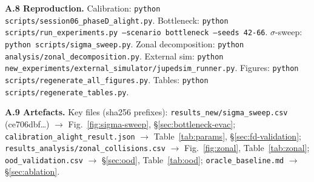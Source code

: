 \documentclass[a4paper,twoside]{article}
\begin{document}
\textbf{A.8 Reproduction.} Calibration: \texttt{python scripts/session06\_phaseD\_alight.py}. Bottleneck: \texttt{python scripts/run\_experiments.py --scenario bottleneck --seeds 42-66}. $\sigma$-sweep: \texttt{python scripts/sigma\_sweep.py}. Zonal decomposition: \texttt{python analysis/zonal\_decomposition.py}. External sim: \texttt{python new\_experiments/external\_simulator/jupedsim\_runner.py}. Figures: \texttt{python scripts/regenerate\_all\_figures.py}. Tables: \texttt{python scripts/regenerate\_tables.py}.

\textbf{A.9 Artefacts.} Key files (sha256 prefixes): \texttt{results\_new/sigma\_sweep.csv} (ce706dbf\ldots) $\to$ Fig.~\ref{fig:sigma-sweep}, \S\ref{sec:bottleneck-evac}; \texttt{calibration\_alight\_result.json} $\to$ Table~\ref{tab:params}, \S\ref{sec:fd-validation}; \texttt{results\_analysis/zonal\_collisions.csv} $\to$ Fig.~\ref{fig:zonal}, Table~\ref{tab:zonal}; \texttt{ood\_validation.csv} $\to$ \S\ref{sec:ood}, Table~\ref{tab:ood}; \texttt{oracle\_baseline.md} $\to$ \S\ref{sec:ablation}.

\normalsize
\end{document}
